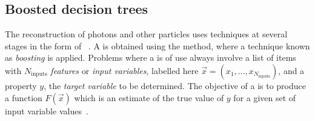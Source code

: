 \begin{table}[htbp]
\begin{small}
\begin{center}
\end{center} 
\end{small}
\caption{Photon preselection efficiency (using all requirements aside from the electron veto) measured using \Zee
events in data and simulation with a \TagAndProbe technique.}
\label{tab:reco:preslection_eff}
\end{table}


\subsection{Boosted decision trees}
\label{reco:sec:bdt}

The reconstruction of photons and other particles uses \MVA techniques at several stages in the form of \BDT\s~\cite{friedman2009}. A \BDT is obtained using the \DT method, where a technique known as \emph{boosting} is applied. Problems where a \BDT is of use always involve a list of items with $N_{\textrm{inputs}}$ \emph{features} or \emph{input variables}, labelled here $\vec{x} =(x_1, ... ,x_{N_{\textrm{inputs}}})$, and a property $y$, the \emph{target variable} to be determined. The objective of a \BDT is to produce a function $F(\vec{x})$ which is an estimate of the true value of $y$ for a given set of input variable values~\cite{friedman2001}. 

